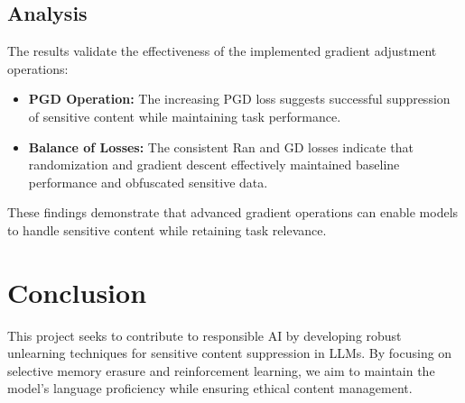 \documentclass[11pt]{article}
\begin{document}
    \subsection{Analysis}
    The results validate the effectiveness of the implemented gradient adjustment operations:
    \begin{itemize}
        \item \textbf{PGD Operation:} The increasing PGD loss suggests successful suppression of sensitive content while maintaining task performance.
        \item \textbf{Balance of Losses:} The consistent Ran and GD losses indicate that randomization and gradient descent effectively maintained baseline performance and obfuscated sensitive data.
    \end{itemize}
    These findings demonstrate that advanced gradient operations can enable models to handle sensitive content while retaining task relevance.


    \section{Conclusion}
    This project seeks to contribute to responsible AI by developing robust unlearning techniques for sensitive content suppression in LLMs. By focusing on selective memory erasure and reinforcement learning, we aim to maintain the model's language proficiency while ensuring ethical content management.


    
    
\end{document}
